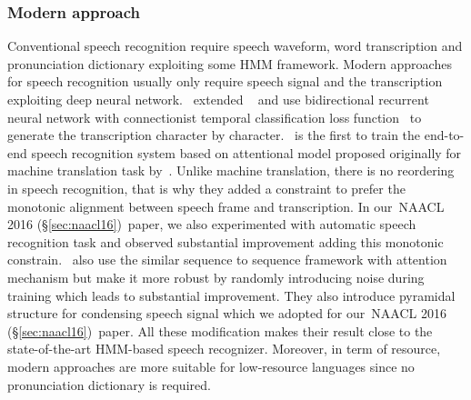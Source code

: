 \documentclass[12pt,twoside,final,hidelinks]{ltthesis}
\theoremstyle{definition}
\newcommand\naaclvi{NAACL 2016 (\S\ref{sec:naacl16})}
\begin{document}
\subsubsection{Modern approach}
Conventional speech recognition require speech waveform, word transcription and pronunciation dictionary  exploiting some HMM framework. Modern approaches for speech 
recognition usually only require speech signal and the transcription exploiting deep neural network.~ extended ~ and use bidirectional recurrent neural network with connectionist temporal classification loss function~\cite{Graves06connectionisttemporal} to generate the transcription character by character.~ is the first to train the end-to-end speech recognition system based on attentional model proposed originally for machine translation task by~. Unlike machine translation, there is no reordering in speech recognition, that is why they added a constraint to prefer the monotonic alignment between speech frame and transcription. In our~\naaclvi\ paper, we also experimented with automatic speech recognition task and observed substantial improvement adding this monotonic constrain.~ also use the similar sequence to sequence framework with attention mechanism but make it more robust by randomly introducing noise during training which leads to substantial improvement. They also introduce pyramidal structure for condensing speech signal which we adopted for our~\naaclvi\ paper. All these modification makes their result close to the state-of-the-art HMM-based speech recognizer. Moreover, in term of resource, modern approaches are more suitable for low-resource languages since no pronunciation dictionary is required. 
\end{document}
